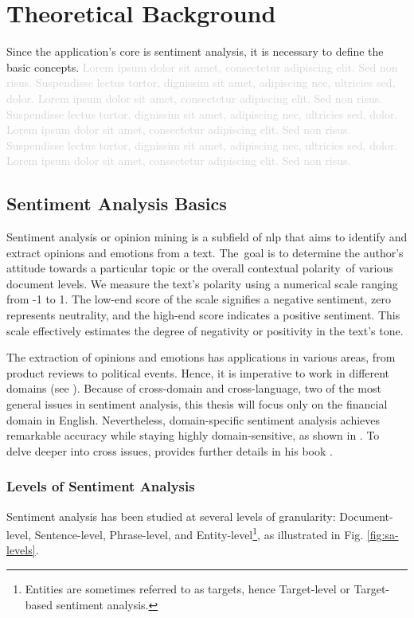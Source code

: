 \chapter{Theoretical Background}
\label{chap:theoretical-background}
Since the application's core is sentiment analysis, it is necessary to define the basic concepts. \textcolor{lightgray}{Lorem ipsum dolor sit amet, consectetur adipiscing elit. Sed non risus. Suspendisse lectus tortor, dignissim sit amet, adipiscing nec, ultricies sed, dolor. Lorem ipsum dolor sit amet, consectetur adipiscing elit. Sed non risus. Suspendisse lectus tortor, dignissim sit amet, adipiscing nec, ultricies sed, dolor. Lorem ipsum dolor sit amet, consectetur adipiscing elit. Sed non risus. Suspendisse lectus tortor, dignissim sit amet, adipiscing nec, ultricies sed, dolor. Lorem ipsum dolor sit amet, consectetur adipiscing elit. Sed non risus.}

\section{Sentiment Analysis Basics}
\label{sec:sentiment-analysis-basics}
Sentiment analysis or opinion mining is a subfield of \acrfull{nlp} that aims to identify and extract opinions and emotions from a text. The~goal is to determine the author's attitude towards a particular topic or the overall contextual polarity~of various document levels. We measure the text's polarity using a numerical scale ranging from -1 to 1. The low-end score of the scale signifies a negative sentiment, zero represents neutrality, and the high-end score indicates a positive sentiment. This scale effectively estimates the degree of negativity or positivity in the text's tone. 

The extraction of opinions and emotions has applications in various areas, from product reviews to political events. Hence, it is imperative to work in different domains (see \cite{PIRYANI2017122}). Because of cross-domain and cross-language, two of the most general issues in sentiment analysis, this thesis will focus only on the financial domain in English. Nevertheless, domain-specific sentiment analysis achieves remarkable accuracy while staying highly domain-sensitive, as shown in \parencite{saunders_2020}. To delve deeper into cross issues, \citeauthor{liu2022sentiment} provides further details in his book \parencite{liu2022sentiment}.

\subsection{Levels of Sentiment Analysis}
\label{subsec:levels-of-sentiment-analysis}
Sentiment analysis has been studied at several levels of granularity: Document-level, Sentence-level, Phrase-level, and Entity-level\footnote{Entities are sometimes referred to as targets, hence Target-level or Target-based sentiment analysis.}, as illustrated in Fig. \ref{fig:sa-levels}.

